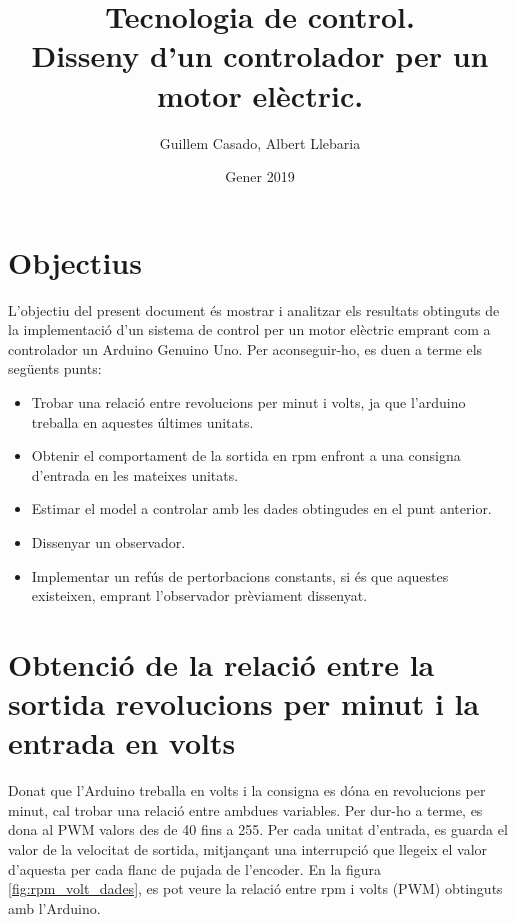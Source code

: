 \documentclass[]{article}
\title{Tecnologia de control. \\ Disseny d'un controlador per un motor elèctric.}
\author{Guillem Casado, Albert Llebaria}
\date{Gener 2019}
\begin{document}
\maketitle


\section{Objectius}

L'objectiu del present document és mostrar i analitzar els resultats obtinguts de la implementació d'un sistema de control per un motor elèctric emprant com a controlador un Arduino Genuino Uno. Per aconseguir-ho, es duen a terme els següents punts: 

\begin{itemize}
	\item Trobar una relació entre revolucions per minut i volts, ja que l'arduino treballa en aquestes últimes unitats.
	\item Obtenir el comportament de la sortida en rpm enfront a una consigna d'entrada en les mateixes unitats. 
	\item Estimar el model a controlar amb les dades obtingudes en el punt anterior.
	\item Dissenyar un observador.
	\item Implementar un refús de pertorbacions constants, si és que aquestes existeixen, emprant l'observador prèviament dissenyat. 
\end{itemize}

\section{Obtenció de la relació entre la sortida revolucions per minut i la entrada en volts}

Donat que l'Arduino treballa en volts i la consigna es dóna en revolucions per minut, cal trobar una relació entre ambdues variables. Per dur-ho a terme, es dona al PWM valors des de 40 fins a 255. Per cada unitat d'entrada, es guarda el valor de la velocitat de sortida, mitjançant una interrupció que llegeix el valor d'aquesta per cada flanc de pujada de l'encoder. En la figura \ref{fig:rpm_volt_dades}, es pot veure la relació entre rpm i volts (PWM) obtinguts amb l'Arduino. 
\end{document}
